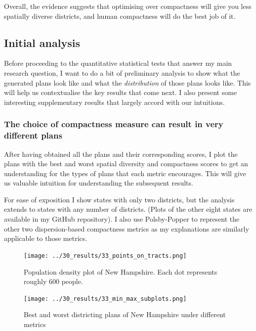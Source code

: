 \documentclass[]{article}
\begin{document}
Overall, the evidence suggests that optimising over compactness will
give you less spatially diverse districts, and human compactness will do
the best job of it.

\hypertarget{initial-analysis}{%
\subsection{Initial analysis}\label{initial-analysis}}

Before proceeding to the quantitative statistical tests that answer my
main research question, I want to do a bit of preliminary analysis to
show what the generated plans look like and what the \emph{distribution}
of those plans looks like. This will help us contextualise the key
results that come next. I also present some interesting supplementary
results that largely accord with our intuitions.

\hypertarget{the-choice-of-compactness-measure-can-result-in-very-different-plans}{%
\subsubsection{The choice of compactness measure can result in very
different
plans}\label{the-choice-of-compactness-measure-can-result-in-very-different-plans}}

After having obtained all the plans and their corresponding scores, I
plot the plans with the best and worst spatial diversity and compactness
scores to get an understanding for the types of plans that each metric
encourages. This will give us valuable intuition for understanding the
subsequent results.

For ease of exposition I show states with only two districts, but the
analysis extends to states with any number of districts. (Plots of the
other eight states are available in my GitHub repository). I also use
Polsby-Popper to represent the other two dispersion-based compactness
metrics as my explanations are similarly applicable to those metrics.

\begin{figure}
\centering
\texttt{[image: ../30\_results/33\_points\_on\_tracts.png]}
\caption{Population density plot of New Hampshire. Each dot represents
roughly 600 people. \label{nh_density}}
\end{figure}

\begin{figure}
\centering
\texttt{[image: ../30\_results/33\_min\_max\_subplots.png]}
\caption{Best and worst districting plans of New Hampshire under
different metrics \label{nh_minmax}}
\end{figure}
\end{document}
